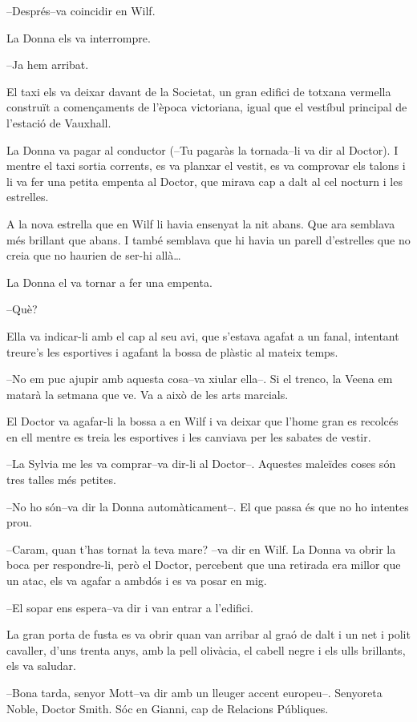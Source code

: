 --Després--va coincidir en Wilf.

La Donna els va interrompre.

--Ja hem arribat.

El taxi els va deixar davant de la Societat, un gran edifici de totxana
vermella construït a començaments de l'època victoriana, igual que el
vestíbul principal de l'estació de Vauxhall.

La Donna va pagar al conductor (--Tu pagaràs la tornada--li va dir al
Doctor). I mentre el taxi sortia corrents, es va planxar el vestit, es
va comprovar els talons i li va fer una petita empenta al Doctor, que
mirava cap a dalt al cel nocturn i les estrelles.

A la nova estrella que en Wilf li havia ensenyat la nit abans. Que ara
semblava més brillant que abans. I també semblava que hi havia un parell
d'estrelles que no creia que no haurien de ser-hi allà\ldots{}

La Donna el va tornar a fer una empenta.

--Què?

Ella va indicar-li amb el cap al seu avi, que s'estava agafat a un
fanal, intentant treure's les esportives i agafant la bossa de plàstic
al mateix temps.

--No em puc ajupir amb aquesta cosa--va xiular ella--. Si el trenco, la
Veena em matarà la setmana que ve. Va a això de les arts marcials.

El Doctor va agafar-li la bossa a en Wilf i va deixar que l'home gran es
recolcés en ell mentre es treia les esportives i les canviava per les
sabates de vestir.

--La Sylvia me les va comprar--va dir-li al Doctor--. Aquestes maleïdes
coses són tres talles més petites.

--No ho són--va dir la Donna automàticament--. El que passa és que no ho
intentes prou.

--Caram, quan t'has tornat la teva mare? --va dir en Wilf. La Donna va
obrir la boca per respondre-li, però el Doctor, percebent que una
retirada era millor que un atac, els va agafar a ambdós i es va posar en
mig.

--El sopar ens espera--va dir i van entrar a l'edifici.

La gran porta de fusta es va obrir quan van arribar al graó de dalt i un
net i polit cavaller, d'uns trenta anys, amb la pell olivàcia, el cabell
negre i els ulls brillants, els va saludar.

--Bona tarda, senyor Mott--va dir amb un lleuger accent europeu--.
Senyoreta Noble, Doctor Smith. Sóc en Gianni, cap de Relacions
Públiques.

